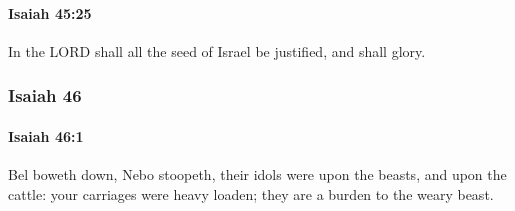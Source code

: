 		\paragraph{Isaiah 45:25} %
			\label{ISAIAH-45-25}

			In the LORD shall all the seed of Israel be justified, and shall glory.

	\subsubsection{Isaiah 46} %
		\label{ISAIAH-46}

		\paragraph{Isaiah 46:1} %
			\label{ISAIAH-46-1}

			Bel boweth down, Nebo stoopeth, their idols were upon the beasts, and upon the cattle: your carriages were heavy loaden; they are a burden to the weary beast.


